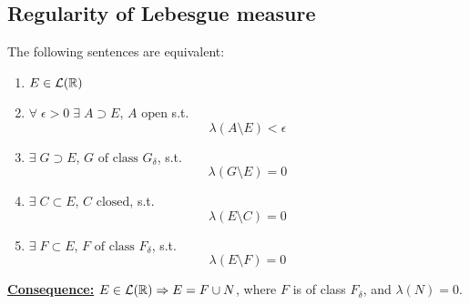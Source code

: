 \subsection{Regularity of Lebesgue measure}
\begin{theorem}
    The following sentences are equivalent:
    \begin{enumerate}
        \item \(E \in \mathcal{L}(\mathbb{R})\)
        \item \(\forall \; \epsilon > 0 \; \exists \; A \supset E\), \(A \mbox{ open}\) s.t.
        \[
            \lambda \left(A \setminus E\right) < \epsilon
        \]
        \item \(\exists \; G \supset E\), \(G \mbox{ of class } G_{\delta}\), s.t. 
        \[
            \lambda(G\setminus E) = 0
        \]
        \item \(\exists \; C \subset E\), \(C \mbox{ closed}\), s.t. 
        \[
            \lambda(E\setminus C) = 0
        \]
        \item \(\exists \; F \subset E\), \(F \mbox{ of class } F_{\delta}\), s.t. 
        \[
            \lambda(E\setminus F) = 0
        \]
    \end{enumerate}
\end{theorem}
\noindent\underline{\textbf{Consequence:}} \(E \in \mathcal{L}(\mathbb{R}) \Rightarrow E = F \cup N\), where \(F\) is of class \(F_{\delta}\), and \(\lambda(N) = 0\).
